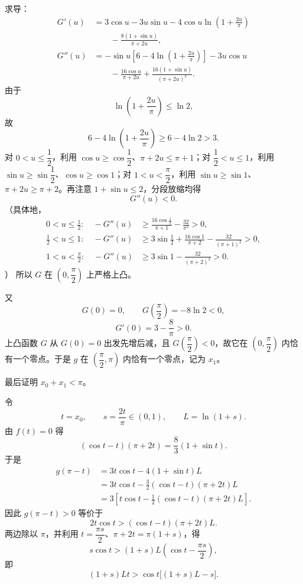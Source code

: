 \begin{answer}
求导：
\nopagebreak[4]
\[\begin{aligned}
G'(u)
&=3\cos u-3u\sin u-4\cos u\ln\left(1+\frac{2u}{\pi}\right)\\
&\qquad-\frac{8(1+\sin u)}{\pi+2u},\\
G''(u)
&=-\sin u\left[6-4\ln\left(1+\frac{2u}{\pi}\right)\right]-3u\cos u\\
&\qquad-\frac{16\cos u}{\pi+2u}
+\frac{16(1+\sin u)}{(\pi+2u)^2}.
\end{aligned}\]
由于
\nopagebreak[4]
\[\ln\left(1+\frac{2u}{\pi}\right)\leqslant\ln2,\]
故
\nopagebreak[4]
\[6-4\ln\left(1+\frac{2u}{\pi}\right)\geqslant6-4\ln2>3.\]
对 $0<u\leqslant\dfrac12$，利用 $\cos u\geqslant\cos\dfrac12$、$\pi+2u\leqslant\pi+1$；对 $\dfrac12<u\leqslant1$，利用 $\sin u\geqslant\sin\dfrac12$、$\cos u\geqslant\cos1$；对 $1<u<\dfrac\pi2$，利用 $\sin u\geqslant\sin1$、$\pi+2u\geqslant\pi+2$。再注意 $1+\sin u\leqslant2$，分段放缩均得
\nopagebreak[4]
\[G''(u)<0.\]
（具体地，
\nopagebreak[4]
\[\begin{aligned}
0<u\leqslant\tfrac12:\quad
-G''(u)&\geqslant\frac{16\cos\frac12}{\pi+1}-\frac{32}{\pi^2}>0,\\
\tfrac12<u\leqslant1:\quad
-G''(u)&\geqslant3\sin\frac12+\frac{16\cos1}{\pi+2}-\frac{32}{(\pi+1)^2}>0,\\
1<u<\tfrac\pi2:\quad
-G''(u)&\geqslant3\sin1-\frac{32}{(\pi+2)^2}>0.
\end{aligned}\]
）
所以 $G$ 在 $\left(0,\dfrac\pi2\right)$ 上严格上凸。

又
\nopagebreak[4]
\[G(0)=0,\qquad
G\left(\frac\pi2\right)=-8\ln2<0,\]
\nopagebreak[4]
\[G'(0)=3-\frac8\pi>0.\]
上凸函数 $G$ 从 $G(0)=0$ 出发先增后减，且 $G\left(\dfrac\pi2\right)<0$，故它在 $\left(0,\dfrac\pi2\right)$ 内恰有一个零点。于是 $g$ 在 $\left(\dfrac\pi2,\pi\right)$ 内恰有一个零点，记为 $x_1$。

最后证明 $x_0+x_1<\pi$。

令
\nopagebreak[4]
\[t=x_0,\qquad s=\frac{2t}{\pi}\in(0,1),\qquad L=\ln(1+s).\]
由 $f(t)=0$ 得
\nopagebreak[4]
\[(\cos t-t)(\pi+2t)=\frac83(1+\sin t).\tag{1}\]
于是
\nopagebreak[4]
\[\begin{aligned}
g(\pi-t)
&=3t\cos t-4(1+\sin t)L\\
&=3t\cos t-\frac32(\cos t-t)(\pi+2t)L\\
&=3\left[t\cos t-\frac12(\cos t-t)(\pi+2t)L\right].
\end{aligned}\]
因此 $g(\pi-t)>0$ 等价于
\nopagebreak[4]
\[2t\cos t>(\cos t-t)(\pi+2t)L.\]
两边除以 $\pi$，并利用 $t=\dfrac{\pi s}{2}$、$\pi+2t=\pi(1+s)$，得
\nopagebreak[4]
\[s\cos t>(1+s)L\left(\cos t-\frac{\pi s}{2}\right),\]
即
\nopagebreak[4]
\[(1+s)Lt>\cos t\bigl[(1+s)L-s\bigr].\tag{2}\]


\end{answer}
